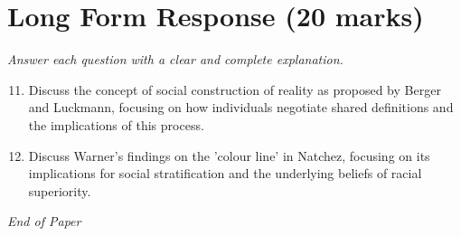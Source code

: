 \documentclass[12pt]{article}
\begin{document}
\section*{Long Form Response (20 marks)}
\textit{Answer each question with a clear and complete explanation.}
\begin{enumerate}[label=\arabic*.]
\setcounter{enumi}{10}
\item Discuss the concept of social construction of reality as proposed by Berger and Luckmann, focusing on how individuals negotiate shared definitions and the implications of this process.
\item Discuss Warner's findings on the 'colour line' in Natchez, focusing on its implications for social stratification and the underlying beliefs of racial superiority.
\end{enumerate}

\vfill
\noindent\textit{End of Paper}
\end{document}
